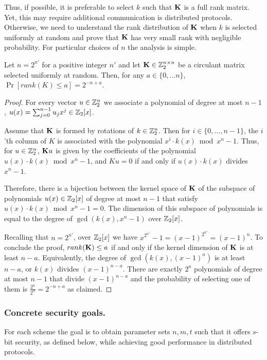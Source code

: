 Thus, if possible, it is preferable to select $k$ such that $\mat{K}$
is a full rank matrix. Yet, this may require additional communication
is distributed protocols.
Otherwise, we need to understand the rank distribution of $\mat{K}$
when $k$ is selected uniformly at random and prove that $\mat{K}$
has very small rank with negligible probability.
For particular choices of $n$ the analysis is simple.
\begin{proposition}
\label{prop:rank}
Let $n = 2^{n'}$ for a positive integer $n'$
and let $\mat{K} \in \Z_2^{n \times n}$
be a circulant matrix selected uniformly at random.
Then, for any $a \in \{0,\ldots n\}$,
$\Pr[rank(K) \leq a] = 2^{-n+a}$.
\end{proposition}

\begin{proof}
For every vector $u \in \mathbb{Z}_2^{n}$
we associate a polynomial of degree at most $n-1$,
$u(x) = \sum_{j=0}^{n-1} u_j x^{j} \in \mathbb{Z}_2[x]$.

Assume that $\mat{K}$ is formed by rotations
of $k \in \mathbb{Z}_2^{n}$.
Then for $i \in \{0,\ldots, n-1\}$,
the $i$'th column of $K$ is associated with the polynomial
$x^i \cdot k(x) \bmod x^n - 1$.
Thus, for $u \in \mathbb{Z}_2^{n}$, $\mat{K}u$ is given
by the coefficients of the polynomial
$u(x) \cdot k(x) \bmod x^n - 1$,
and $Ku = 0$ if and only if
$u(x) \cdot k(x)$ divides $x^n - 1$.

Therefore, there is a bijection between the kernel space of $\mat{K}$
of the subspace of polynomials $u(x) \in \mathbb{Z}_2[x]$
of degree at most $n-1$
that satisfy $u(x) \cdot k(x) \bmod x^n - 1 = 0$.
The dimension of this subspace of polynomials is equal to
the degree of $\gcd(k(x), x^n - 1)$ over $\mathbb{Z}_2[x]$.

Recalling that $n = 2^{n'}$, over $\mathbb{Z}_2[x]$ we have
$x^{2^{n'}} - 1 = (x - 1)^{2^{n'}} = (x - 1)^n$.
To conclude the proof,
$rank(\mat{K}) \leq a$ if and only if
the kernel dimension of $\mat{K}$ is at least $n-a$.
Equivalently, the degree of $\gcd(k(x), (x - 1)^n)$
is at least $n-a$, or
$k(x)$ divides $(x - 1)^{n-a}$.
There are exactly $2^a$ polynomials of degree at most
$n-1$ that divide $(x - 1)^{n-a}$
and the probability of selecting one of them is
$\tfrac{2^{a}}{2^n} = 2^{-n+a}$ as claimed.
\end{proof}




\subsubsection{Concrete security goals.}
For each scheme the goal is to obtain parameter sets $n,m,t$ such that it offers
$s$-bit security, as defined below, while achieving good performance in distributed protocols.

